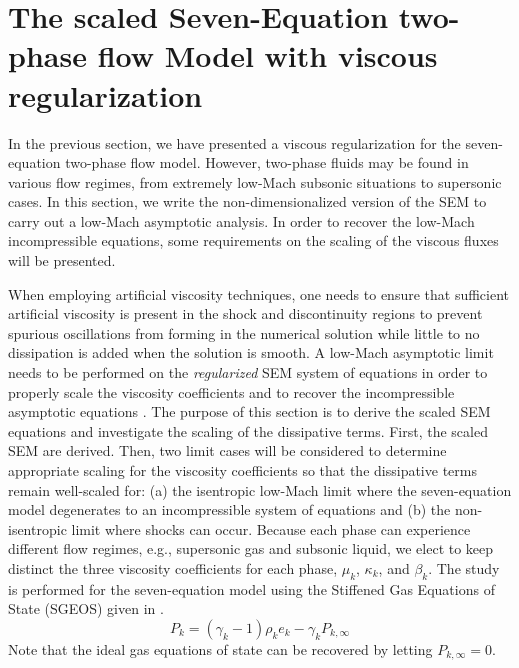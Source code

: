 \documentclass[preprint,10pt]{elsarticle}
\begin{document}
\section{The scaled Seven-Equation two-phase flow Model with viscous regularization}\label{sec:low-Mach}
%
In the previous section, we have presented a viscous regularization for the seven-equation two-phase flow model.  However,
two-phase fluids may be found in various flow regimes, from extremely low-Mach subsonic situations to supersonic cases.
In this section, we write the non-dimensionalized version of the SEM to carry out a low-Mach asymptotic analysis. In order to 
recover the low-Mach incompressible equations, some requirements on the scaling of the viscous fluxes will be presented.  

When employing artificial viscosity techniques, one needs to ensure that sufficient artificial viscosity is present in the shock 
and discontinuity regions to prevent spurious oscillations from forming in the numerical solution while little to no dissipation 
is added when the solution is smooth.
A low-Mach asymptotic limit needs to be performed on the {\it regularized} SEM system of equations in order to properly scale the viscosity 
coefficients and to recover the incompressible asymptotic equations \cite{LowMach1, LowMach2, LowMach3}. The purpose of this section is to 
derive the scaled SEM equations and investigate the scaling of the dissipative terms. 
First, the scaled SEM are derived. Then, two limit cases will be considered to determine 
appropriate scaling for the viscosity coefficients so that the dissipative terms remain well-scaled for: 
(a) the isentropic low-Mach limit where the seven-equation model degenerates to an incompressible system of 
equations and (b) the non-isentropic limit where shocks can occur. 
Because each phase can experience different flow regimes, e.g., supersonic gas and subsonic liquid, we elect to keep distinct the three viscosity 
coefficients for each phase, $\mu_k$, $\kappa_k$, and $\beta_k$. The study is performed for the seven-equation model using the Stiffened Gas 
Equations of State (SGEOS) given in .
%
\begin{equation}\label{eq:SGEOS_bis}
P_k = \left( \gamma_k-1 \right) \rho_k e_k - \gamma_k P_{k,\infty}
\end{equation}
Note that the ideal gas equations of state can be recovered by letting $P_{k,\infty}=0$.
%
\end{document}
